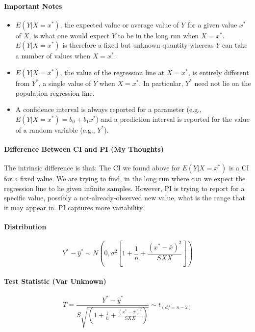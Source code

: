 \documentclass[11pt]{article}
\begin{document}
\paragraph{Important Notes}
\begin{itemize}
    \item $E(Y | X = x^*)$, the expected value or average value of $Y$ for a given value $x^*$ of $X$, is what one would expect $Y$ to be in the long run when $X = x^*$. $E(Y | X = x^*)$ is therefore a fixed but unknown quantity whereas $Y$ can take a number of values when $X = x^*$.
    \item $E(Y | X = x^*)$, the value of the regression line at $X = x^*$, is entirely different from $Y^*$, a single value of $Y$ when $X = x^*$. In particular, $Y^*$ need not lie on the population regression line.
    \item A confidence interval is always reported for a parameter (e.g., $E(Y | X = x^*) = b_0 + b_1x^*$) and a prediction interval is reported for the value of a random variable (e.g., $Y^*$).
\end{itemize}

\paragraph{Difference Between CI and PI (My Thoughts)} The intrinsic difference is that: The CI we found above for $E(Y | X = x^*)$ is a CI for a fixed value. We are trying to find, in the long run where can we expect the regression line to lie given infinite samples. However, PI is trying to report for a specific value, possibly a not-already-observed new value, what is the range that it may appear in. PI captures more variability. 

\paragraph{Distribution}
\begin{equation*}
    Y^{*}-\hat{y}^{*} \sim N\left(0, \sigma^{2}\left[1+\frac{1}{n}+\frac{\left(x^{*}-\bar{x}\right)^{2}}{S X X}\right]\right)
\end{equation*}

\paragraph{Test Statistic (Var Unknown)}
\begin{equation*}
    T=\frac{Y^*-\hat{y}^*}{S \sqrt{\left(1+\frac{1}{n}+\frac{\left(x^{*}-\bar{x}\right)^{2}}{S X X}\right)}} \sim t_{(df = n-2)}
\end{equation*}
\end{document}
